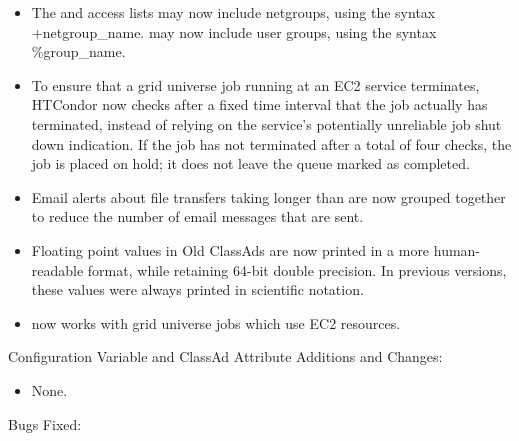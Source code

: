 \begin{itemize}

\item The  and  access lists may now include netgroups,
using the syntax +netgroup\_name.   may now include 
user groups, using the syntax \%group\_name.

\item To ensure that a grid universe job running at an EC2 service
terminates, 
HTCondor now checks after a fixed time interval 
that the job actually has terminated,
instead of relying on the service's potentially unreliable 
job shut down indication.
If the job has not terminated after a total of four checks,
the job is placed on hold; it does not leave the queue marked as completed.

\item Email alerts about file transfers taking longer than
 are now grouped together
to reduce the number of email messages that are sent.

\item Floating point values in Old ClassAds are now printed in a more
human-readable format, while retaining 64-bit double precision.
In previous versions, these values were always printed in scientific
notation.

\item {} now works with grid universe jobs
which use EC2 resources.

\end{itemize}

\noindent Configuration Variable and ClassAd Attribute Additions and Changes:

\begin{itemize}

\item None.

\end{itemize}

\noindent Bugs Fixed:

